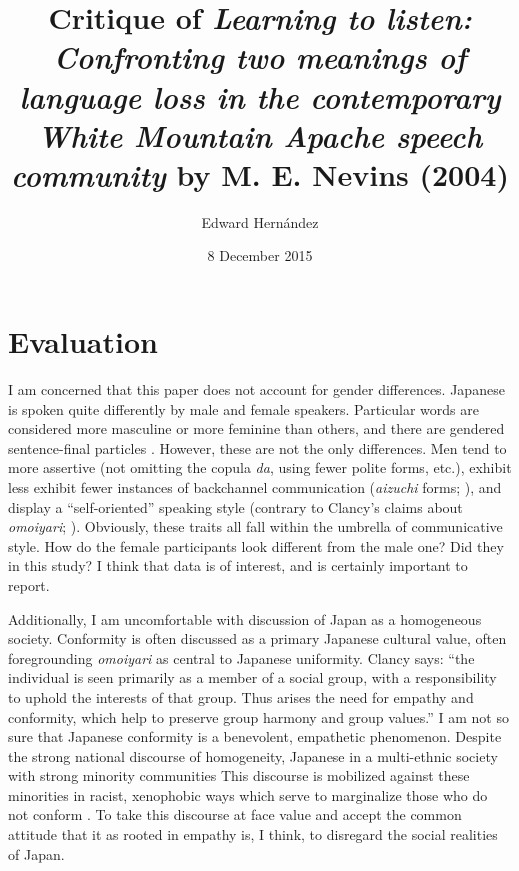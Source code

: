 \documentclass[man,12pt,natbib]{apa6}
\begin{document}
\section{Evaluation}

I am concerned that this paper does not account for gender differences.
Japanese is spoken quite differently by male and female speakers. Particular
words are considered more masculine or more feminine than others, and there are
gendered sentence-final particles \citep{Siegal03}. However, these are not the
only differences. Men tend to more assertive (not omitting the copula
\emph{da}, using fewer polite forms, etc.), exhibit less exhibit fewer
instances of backchannel communication (\emph{aizuchi} forms;
\citealp{Kita07,Tanaka04}), and display a ``self-oriented'' speaking style
(contrary to Clancy's claims about \emph{omoiyari}; \citealp{Itakura04}).
Obviously, these traits all fall within the umbrella of communicative style.
How do the female participants look different from the male one? Did they in
this study? I think that data is of interest, and is certainly important to
report.

Additionally, I am uncomfortable with discussion of Japan as a homogeneous
society. Conformity is often discussed as a primary Japanese cultural value,
often foregrounding \emph{omoiyari} as central to Japanese uniformity. Clancy
says: ``the individual is seen primarily as a member of a social group, with a
responsibility to uphold the interests of that group. Thus arises the need for
empathy and conformity, which help to preserve group harmony and group
values.'' I am not so sure that Japanese conformity is a benevolent, empathetic
phenomenon.  Despite the strong national discourse of homogeneity, Japanese in
a multi-ethnic society with strong minority communities \citep{Lie01} This
discourse is mobilized against these minorities in racist, xenophobic ways
which serve to marginalize those who do not conform \citep{Diene06}. To take
this discourse at face value and accept the common attitude that it as rooted
in empathy is, I think, to disregard the social realities of Japan.


\clearpage

\title{Critique of \emph{Learning to listen: Confronting two meanings of
language loss in the contemporary White Mountain Apache speech community} by M.
E. Nevins (2004)}
\author{Edward Hern\'{a}ndez}
\date{8 December 2015}
\maketitle
\end{document}
